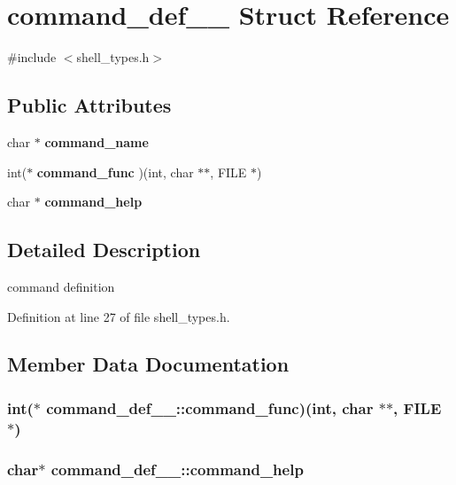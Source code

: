 \section{command\_\-def\_\-\_\- Struct Reference}
\label{structcommand__def____}


{\ttfamily \#include $<$shell\_\-types.h$>$}\subsection*{Public Attributes}
\begin{DoxyCompactItemize}
\item 
char $\ast$ {\bf command\_\-name}
\item 
int($\ast$ {\bf command\_\-func} )(int, char $\ast$$\ast$, FILE $\ast$)
\item 
char $\ast$ {\bf command\_\-help}
\end{DoxyCompactItemize}


\subsection{Detailed Description}
command definition 

Definition at line 27 of file shell\_\-types.h.

\subsection{Member Data Documentation}
\subsubsection[{command\_\-func}]{\setlength{\rightskip}{0pt plus 5cm}int($\ast$ {\bf command\_\-def\_\-\_\-::command\_\-func})(int, char $\ast$$\ast$, FILE $\ast$)}\label{structcommand__def_____a69f8d07ba9009b5a333eed7ff5a20c17}
\subsubsection[{command\_\-help}]{\setlength{\rightskip}{0pt plus 5cm}char$\ast$ {\bf command\_\-def\_\-\_\-::command\_\-help}}\label{structcommand__def_____a4251bac8477b9c896e6f411ea2081bd9}


